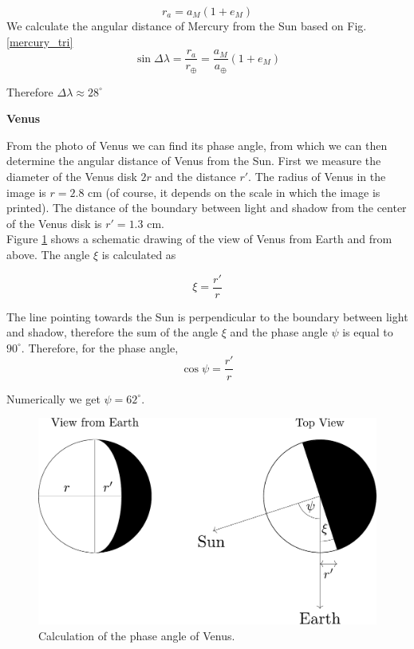 \documentclass[a4paper,12pt]{extarticle}
\begin{document}
\begin{sol}
	\[r_a=a_M(1+e_M)\]
	We calculate the angular distance of Mercury from the Sun based on Fig. \ref{mercury_tri}
	\[\sin\Delta \lambda =\frac{r_a}{r_\oplus}=\frac{a_M}{a_\oplus}(1+e_M)\]
	
	Therefore $\Delta \lambda\approx
	28^\circ$
	
\newpage
	
	\textbf{Venus}
	
	\begin{multicols}{2}
	
	From the photo of Venus we can find its phase angle, from which we can then determine the angular distance of Venus from the Sun. First we measure the diameter of the Venus disk $2r$ and the distance $r'$. The radius of Venus in the image is $r = 2.8$ cm (of course, it depends on the scale in which the image is printed). The distance of the boundary between light and shadow from the center of the Venus disk is $r'=1.3$ cm.\\
	
	Figure \ref{venus2} shows a schematic drawing of the view of Venus from Earth and from above. The angle $\xi$ is calculated as
	
	\[\xi=\frac{r'}{r}\]
	
	The line pointing towards the Sun is perpendicular to the boundary between light and shadow, therefore the sum of the angle $\xi$ and the phase angle $\psi$ is equal to $90^\circ$. Therefore, for the phase angle,
	\[\cos\psi=\frac{r'}{r}\]
	
	Numerically we get $\psi= 62^\circ$.
	
\begin{figure}[H]
	\centering
	\includegraphics[width=\linewidth]{venus_pos1.pdf}
	\caption{Calculation of the phase angle of Venus.}
	\label{venus2}
\end{figure}


\end{multicols}
\end{sol}
\end{document}
